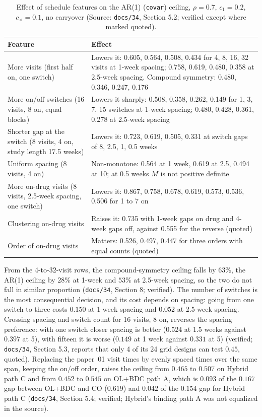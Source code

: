 \documentclass[11pt]{article}
\newcommand{\code}[1]{\texttt{#1}}
\begin{document}
\begin{table}[h]
\centering\small
\caption{Effect of schedule features on the AR(1) (\code{covar})
ceiling, $\rho = 0.7$, $c_1 = 0.2$, $c_\times = 0.1$, no carryover
(Source: \code{docs/34}, Section 5.2; verified except where marked
quoted).}
\label{tab:inve-schedule}
\begin{tabular}{@{}p{3.6cm}p{10.2cm}@{}}
\toprule
Feature & Effect \\
\midrule
More visits (first half on, one switch) & Lowers it: 0.605, 0.564, 0.508, 0.434 for 4, 8, 16, 32 visits at 1-week spacing; 0.758, 0.619, 0.480, 0.358 at 2.5-week spacing. Compound symmetry: 0.480, 0.346, 0.247, 0.176 \\
More on/off switches (16 visits, 8 on, equal blocks) & Lowers it sharply: 0.508, 0.358, 0.262, 0.149 for 1, 3, 7, 15 switches at 1-week spacing; 0.480, 0.428, 0.361, 0.278 at 2.5-week spacing \\
Shorter gap at the switch (8 visits, 4 on, study length 17.5 weeks) & Lowers it: 0.723, 0.619, 0.505, 0.331 at switch gaps of 8, 2.5, 1, 0.5 weeks \\
Uniform spacing (8 visits, 4 on) & Non-monotone: 0.564 at 1 week, 0.619 at 2.5, 0.494 at 10; at 0.5 weeks $M$ is not positive definite \\
More on-drug visits (8 visits, 2.5-week spacing, one switch) & Lowers it: 0.867, 0.758, 0.678, 0.619, 0.573, 0.536, 0.506 for 1 to 7 on \\
Clustering on-drug visits & Raises it: 0.735 with 1-week gaps on drug and 4-week gaps off, against 0.555 for the reverse (quoted) \\
Order of on-drug visits & Matters: 0.526, 0.497, 0.447 for three orders with equal counts (quoted) \\
\bottomrule
\end{tabular}
\end{table}

From the 4-to-32-visit rows, the compound-symmetry ceiling falls by
$63\%$, the AR(1) ceiling by $28\%$ at 1-week and $53\%$ at 2.5-week
spacing, so the two do not fall in similar proportion (\code{docs/34},
Section 8; verified). The number of switches is the most consequential
decision, and its cost depends on spacing: going from one switch to
three costs $0.150$ at 1-week spacing and $0.052$ at 2.5-week spacing.
Crossing spacing and switch count for 16 visits, 8 on, reverses the
spacing preference: with one switch closer spacing is better ($0.524$
at 1.5 weeks against $0.397$ at 5), with fifteen it is worse ($0.149$
at 1 week against $0.331$ at 5) (verified; \code{docs/34}, Section 5.3,
reports that only 4 of its 24 grid designs can test $0.45$, quoted).
Replacing the paper~01 visit times by evenly spaced times over the same
span, keeping the on/off order, raises the ceiling from $0.465$ to
$0.507$ on Hybrid path C and from $0.452$ to $0.545$ on OL+BDC path A,
which is $0.093$ of the $0.167$ gap between OL+BDC and CO ($0.619$)
and $0.042$ of the $0.154$ gap for Hybrid path C (\code{docs/34},
Section 5.4; verified; Hybrid's binding path A was not equalized in the
source).
\end{document}
